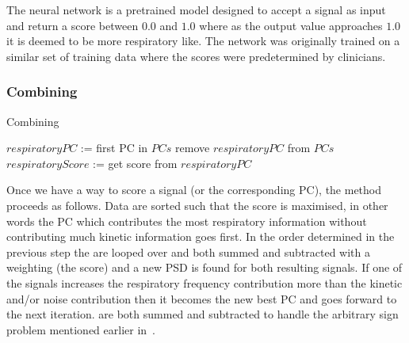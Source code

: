             The neural network is a pretrained model designed to accept a signal as input and return a score between $0.0$ and $1.0$ where as the output value approaches $1.0$ it is deemed to be more respiratory like. The network was originally trained on a similar set of training data where the scores were predetermined by clinicians.
        
        
        \subsubsection{Combining } \label{sec:combining_pcs}
            \begin{algorithm}
                \caption{Combining }
                \;
                $respiratoryPC$ := first \gls{PC} in $PCs$\;
                remove $respiratoryPC$ from $PCs$\;
                $respiratoryScore$ := get score from $respiratoryPC$\;
                \;
            \end{algorithm} \label{eq:combining_pcs_pseudo_code}
            
            Once we have a way to score a signal (or the corresponding PC), the method proceeds as follows. Data are sorted such that the score is maximised, in other words the \gls{PC} which contributes the most respiratory information without contributing much kinetic information goes first. In the order determined in the previous step the  are looped over and both summed and subtracted with a weighting (the score) and a new \gls{PSD} is found for both resulting signals. If one of the signals increases the respiratory frequency contribution more than the kinetic and/or noise contribution then it becomes the new best \gls{PC} and goes forward to the next iteration.  are both summed and subtracted to handle the arbitrary sign problem mentioned earlier in~.
            
